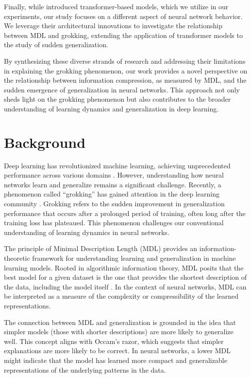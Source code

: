 \documentclass{article} %
\begin{document}
Finally, while \citet{vaswani2017attention} introduced transformer-based models, which we utilize in our experiments, our study focuses on a different aspect of neural network behavior. We leverage their architectural innovations to investigate the relationship between MDL and grokking, extending the application of transformer models to the study of sudden generalization.

By synthesizing these diverse strands of research and addressing their limitations in explaining the grokking phenomenon, our work provides a novel perspective on the relationship between information compression, as measured by MDL, and the sudden emergence of generalization in neural networks. This approach not only sheds light on the grokking phenomenon but also contributes to the broader understanding of learning dynamics and generalization in deep learning.

\section{Background}
\label{sec:background}

Deep learning has revolutionized machine learning, achieving unprecedented performance across various domains \cite{goodfellow2016deep}. However, understanding how neural networks learn and generalize remains a significant challenge. Recently, a phenomenon called ``grokking'' has gained attention in the deep learning community \cite{power2022grokking}. Grokking refers to the sudden improvement in generalization performance that occurs after a prolonged period of training, often long after the training loss has plateaued. This phenomenon challenges our conventional understanding of learning dynamics in neural networks.

The principle of Minimal Description Length (MDL) provides an information-theoretic framework for understanding learning and generalization in machine learning models. Rooted in algorithmic information theory, MDL posits that the best model for a given dataset is the one that provides the shortest description of the data, including the model itself \cite{goodfellow2016deep}. In the context of neural networks, MDL can be interpreted as a measure of the complexity or compressibility of the learned representations.

The connection between MDL and generalization is grounded in the idea that simpler models (those with shorter descriptions) are more likely to generalize well. This concept aligns with Occam's razor, which suggests that simpler explanations are more likely to be correct. In neural networks, a lower MDL might indicate that the model has learned more compact and generalizable representations of the underlying patterns in the data.
\end{document}
